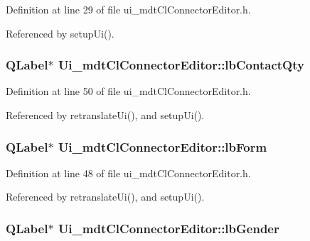 Definition at line 29 of file ui\-\_\-mdt\-Cl\-Connector\-Editor.\-h.



Referenced by setup\-Ui().

\hypertarget{class_ui__mdt_cl_connector_editor_a3ea9fe0b9e36dfaa28793d174f82fc30}{
\subsubsection[{lb\-Contact\-Qty}]{\setlength{\rightskip}{0pt plus 5cm}Q\-Label$\ast$ Ui\-\_\-mdt\-Cl\-Connector\-Editor\-::lb\-Contact\-Qty}}\label{class_ui__mdt_cl_connector_editor_a3ea9fe0b9e36dfaa28793d174f82fc30}


Definition at line 50 of file ui\-\_\-mdt\-Cl\-Connector\-Editor.\-h.



Referenced by retranslate\-Ui(), and setup\-Ui().

\hypertarget{class_ui__mdt_cl_connector_editor_ae30ab71c9a587a20812f7380ca0adf1f}{
\subsubsection[{lb\-Form}]{\setlength{\rightskip}{0pt plus 5cm}Q\-Label$\ast$ Ui\-\_\-mdt\-Cl\-Connector\-Editor\-::lb\-Form}}\label{class_ui__mdt_cl_connector_editor_ae30ab71c9a587a20812f7380ca0adf1f}


Definition at line 48 of file ui\-\_\-mdt\-Cl\-Connector\-Editor.\-h.



Referenced by retranslate\-Ui(), and setup\-Ui().

\hypertarget{class_ui__mdt_cl_connector_editor_a030fbb6e1fd44d609159ba08dca22cbd}{
\subsubsection[{lb\-Gender}]{\setlength{\rightskip}{0pt plus 5cm}Q\-Label$\ast$ Ui\-\_\-mdt\-Cl\-Connector\-Editor\-::lb\-Gender}}\label{class_ui__mdt_cl_connector_editor_a030fbb6e1fd44d609159ba08dca22cbd}


